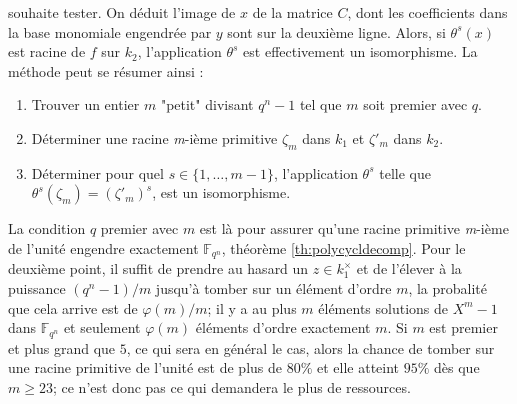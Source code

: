 \documentclass[a4paper]{article} %
\numberwithin{section}{part}
\numberwithin{equation}{section}
\newcommand\nroot[1]{\textit{#1}-ième}
\newcommand\GF[1]{\mathbb{F}_{#1}}
\begin{document}
souhaite tester. On déduit l'image de $x$ de la matrice $C$, dont les 
coefficients dans la base monomiale engendrée par $y$ sont sur la deuxième 
ligne. Alors, si $\theta^s(x)$ est racine de $f$ sur $k_2$, l'application $\theta^s$
est effectivement un isomorphisme. La méthode peut se résumer ainsi :
\vspace{0.3cm}
\begin{enumerate}[1.]
    \item Trouver un entier $m$ "petit" divisant $q^n - 1$ tel que 
    $m$ soit premier avec $q$. 

    \item Déterminer une racine \nroot{m} primitive $\zeta_m$ dans $k_1$ et
    $\zeta'_m$ dans $k_2$.

    \item  Déterminer pour quel $s\in \lbrace{1,\dots,m-1}\rbrace$, 
    l'application $\theta^s$ telle que $\theta^s(\zeta_m) = (\zeta'_m)^s$, est un 
    isomorphisme.
\end{enumerate}
\vspace{0.3cm}
La condition $q$ premier avec $m$ est là pour assurer qu'une racine primitive
\nroot{m} de l'unité engendre exactement $\GF{q^n}$, théorème
\ref{th:polycycldecomp}. Pour le deuxième point, il suffit de prendre au hasard 
un $z\in k_1^{\times}$ et de l'élever à la puissance $(q^n - 1)/m$ jusqu'à 
tomber sur un élément d'ordre $m$, la probalité que cela arrive est de 
$\varphi(m)/m$; il y a au plus $m$ éléments solutions de $X^m - 1$ dans 
$\GF{q^n}$ et seulement $\varphi(m)$ éléments d'ordre exactement $m$. Si $m$ est
premier et plus grand que $5$, ce qui sera en général le cas, alors la chance 
de tomber sur une racine primitive de l'unité est de plus de $80\%$ et elle 
atteint $95\%$ dès que $m \geq 23$; ce n'est donc pas ce qui demandera le plus
de ressources. 
\end{document}
